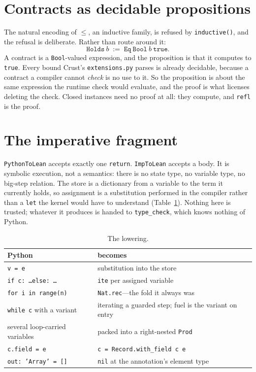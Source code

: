 \documentclass[11pt]{article}
\newcommand{\code}[1]{\texttt{#1}}
\begin{document}
\section{Contracts as decidable propositions}
\label{sec:contracts}

The natural encoding of $\le$, an inductive family, is refused by
\code{inductive()}, and the refusal is deliberate. Rather than route around
it:
\[
  \code{Holds}\ b \;:=\; \code{Eq}\ \code{Bool}\ b\ \code{true}.
\]
A contract is a \code{Bool}-valued expression, and the proposition is that it
computes to \code{true}. Every bound Crust's \code{extensions.py} parses is
already decidable, because a contract a compiler cannot \emph{check} is no use
to it. So the proposition is about the same expression the runtime check would
evaluate, and the proof is what licenses deleting the check. Closed instances
need no proof at all: they compute, and \code{refl} is the proof.

\section{The imperative fragment}
\label{sec:fragment}

\code{PythonToLean} accepts exactly one \code{return}. \code{ImpToLean}
accepts a body. It is symbolic execution, not a semantics: there is no state
type, no variable type, no big-step relation. The store is a dictionary from a
variable to the term it currently holds, so assignment is a substitution
performed in the compiler rather than a \code{let} the kernel would have to
understand (Table~\ref{tab:lowering}). Nothing here is trusted; whatever it
produces is handed to \code{type\_check}, which knows nothing of Python.

\begin{table}[h]
\centering
\small
\begin{tabular}{ll}
\toprule
Python & becomes \\
\midrule
\code{v = e} & substitution into the store \\
\code{if c: \ldots else: \ldots} & \code{ite} per assigned variable \\
\code{for i in range(n)} & \code{Nat.rec}---the fold it always was \\
\code{while c} with a variant & iterating a guarded step; fuel is the variant on entry \\
several loop-carried variables & packed into a right-nested \code{Prod} \\
\code{c.field = e} & \code{c = Record.with\_field c e} \\
\code{out: 'Array' = []} & \code{nil} at the annotation's element type \\
\bottomrule
\end{tabular}
\caption{The lowering.}
\label{tab:lowering}
\end{table}
\end{document}
